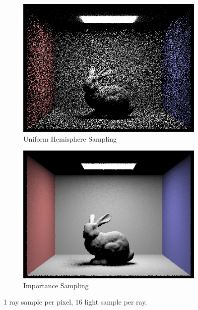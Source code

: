\documentclass{article}
\begin{document}
\begin{figure}
\begin{subfigure}[h]{0.4\textwidth}
\includegraphics[width=\textwidth]{task3/CBbunny_1_16_h.png}
\caption{Uniform Hemisphere Sampling}
\end{subfigure}
\hfill\vrule\hfill
\begin{subfigure}[h]{0.4\textwidth}
\includegraphics[width=\textwidth]{task3/CBbunny_1_16.png}
\caption{Importance Sampling}
\end{subfigure}%

\caption[f3]{1 ray sample per pixel, 16 light sample per ray.}
\end{figure}
\end{document}
